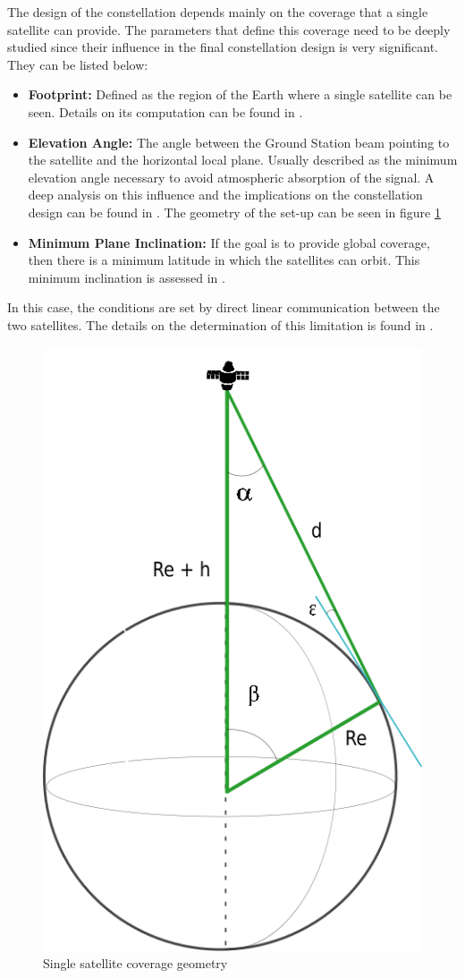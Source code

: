 The design of the constellation depends mainly on the coverage that a single satellite can provide. The parameters that define this coverage need to be deeply studied since their influence in the final constellation design is very significant. They can be listed below:

\begin{itemize}
\item \textbf{Footprint:} Defined as the region of the Earth where a single satellite can
be seen. Details on its computation can be found in \cite[Chapter 2, Section 1]{annex1}. 
\item \textbf{Elevation Angle:} The angle between the Ground Station beam pointing to the satellite and the horizontal local plane. Usually described as the minimum elevation angle necessary to avoid atmospheric absorption of the signal. A deep analysis on this influence and the implications on the constellation design can be found in \cite[Chapter 2, Section 2]{annex1}. The geometry of the set-up can be seen in figure \ref{fig:AngleSSatFoot}
\item \textbf{Minimum Plane Inclination:} If the goal is to provide global coverage, then there is a minimum latitude in which the satellites can orbit. This minimum inclination is assessed in \cite[Chapter 2, Section 3]{annex1}.
\end{itemize}

In this case, the conditions are set by direct linear communication between the two satellites. The details on the determination of this limitation is found in \cite[Chapter 2, Section 4]{annex1}.

\begin{figure}[H] %
	\centering
	\includegraphics[width=.3\textwidth]{./fig-Ch2-OrbitalCoverage/AngleSSatFoot.png}
	\caption{Single satellite coverage geometry}
	\label{fig:AngleSSatFoot}
	
\end{figure}